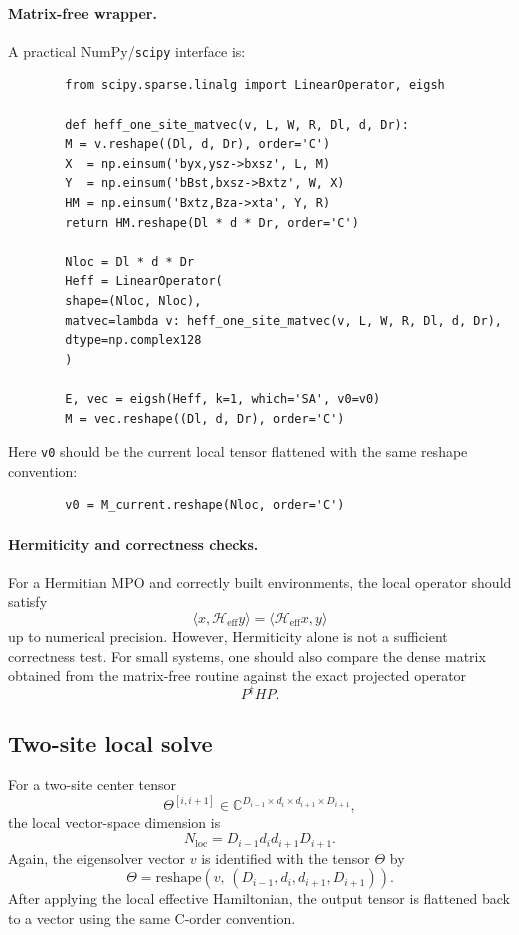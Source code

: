 \documentclass[aps,prb,onecolumn,nofootinbib]{revtex4-2}
\begin{document}
	\paragraph{Matrix-free wrapper.}
	A practical NumPy/\texttt{scipy} interface is:
	\begin{verbatim}
		from scipy.sparse.linalg import LinearOperator, eigsh
		
		def heff_one_site_matvec(v, L, W, R, Dl, d, Dr):
		M = v.reshape((Dl, d, Dr), order='C')
		X  = np.einsum('byx,ysz->bxsz', L, M)
		Y  = np.einsum('bBst,bxsz->Bxtz', W, X)
		HM = np.einsum('Bxtz,Bza->xta', Y, R)
		return HM.reshape(Dl * d * Dr, order='C')
		
		Nloc = Dl * d * Dr
		Heff = LinearOperator(
		shape=(Nloc, Nloc),
		matvec=lambda v: heff_one_site_matvec(v, L, W, R, Dl, d, Dr),
		dtype=np.complex128
		)
		
		E, vec = eigsh(Heff, k=1, which='SA', v0=v0)
		M = vec.reshape((Dl, d, Dr), order='C')
	\end{verbatim}
	
	Here \texttt{v0} should be the current local tensor flattened with the same reshape convention:
	\begin{verbatim}
		v0 = M_current.reshape(Nloc, order='C')
	\end{verbatim}
	
	\paragraph{Hermiticity and correctness checks.}
	For a Hermitian MPO and correctly built environments, the local operator should satisfy
	\[
	\langle x, \mathcal{H}_{\mathrm{eff}} y\rangle
	=
	\langle \mathcal{H}_{\mathrm{eff}} x, y\rangle
	\]
	up to numerical precision. However, Hermiticity alone is not a sufficient correctness test.
	For small systems, one should also compare the dense matrix obtained from the matrix-free
	routine against the exact projected operator
	\[
	P^\dagger H P.
	\]
	
	\subsection{Two-site local solve}
	
	For a two-site center tensor
	\[
	\Theta^{[i,i+1]} \in
	\mathbb{C}^{D_{i-1}\times d_i \times d_{i+1}\times D_{i+1}},
	\]
	the local vector-space dimension is
	\[
	N_{\mathrm{loc}} = D_{i-1} d_i d_{i+1} D_{i+1}.
	\]
	Again, the eigensolver vector $v$ is identified with the tensor $\Theta$ by
	\begin{equation}
		\Theta = \mathrm{reshape}(v,\,(D_{i-1},d_i,d_{i+1},D_{i+1})).
	\end{equation}
	After applying the local effective Hamiltonian, the output tensor is flattened back
	to a vector using the same C-order convention.
	
\end{document}
